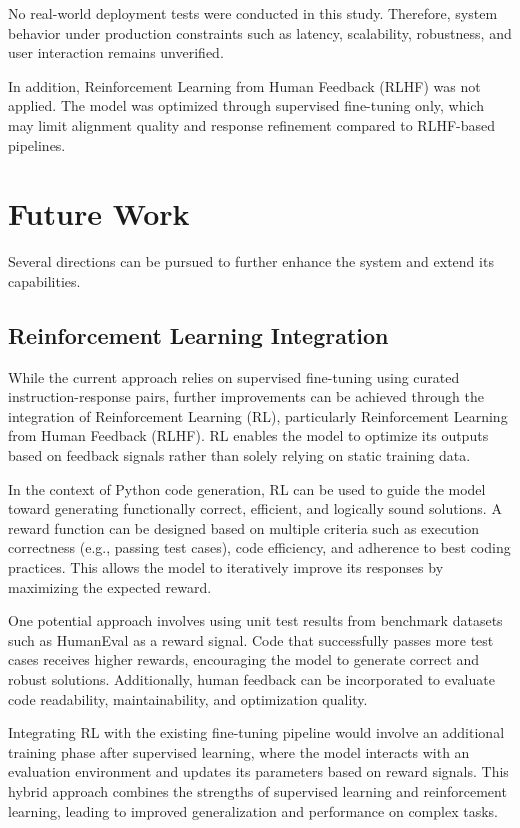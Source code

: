 No real-world deployment tests were conducted in this study. Therefore, system behavior under production constraints such as latency, scalability, robustness, and user interaction remains unverified.

In addition, Reinforcement Learning from Human Feedback (RLHF) was not applied. The model was optimized through supervised fine-tuning only, which may limit alignment quality and response refinement compared to RLHF-based pipelines.

\section{Future Work}

Several directions can be pursued to further enhance the system and extend its capabilities.

\subsection{Reinforcement Learning Integration}

While the current approach relies on supervised fine-tuning using curated instruction-response pairs, further improvements can be achieved through the integration of Reinforcement Learning (RL), particularly Reinforcement Learning from Human Feedback (RLHF). RL enables the model to optimize its outputs based on feedback signals rather than solely relying on static training data.

In the context of Python code generation, RL can be used to guide the model toward generating functionally correct, efficient, and logically sound solutions. A reward function can be designed based on multiple criteria such as execution correctness (e.g., passing test cases), code efficiency, and adherence to best coding practices. This allows the model to iteratively improve its responses by maximizing the expected reward.

One potential approach involves using unit test results from benchmark datasets such as HumanEval as a reward signal. Code that successfully passes more test cases receives higher rewards, encouraging the model to generate correct and robust solutions. Additionally, human feedback can be incorporated to evaluate code readability, maintainability, and optimization quality.

Integrating RL with the existing fine-tuning pipeline would involve an additional training phase after supervised learning, where the model interacts with an evaluation environment and updates its parameters based on reward signals. This hybrid approach combines the strengths of supervised learning and reinforcement learning, leading to improved generalization and performance on complex tasks.

